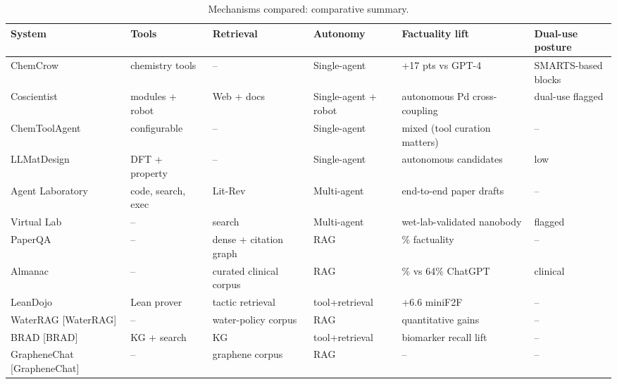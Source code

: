 \documentclass{article}
\begin{document}
\begin{table}[t]
\centering
\caption{Mechanisms compared: comparative summary.}
\label{tab:mechanisms-compared}
\begin{tabular}{>{\raggedright\arraybackslash}p{0.1985\linewidth}
  >{\raggedright\arraybackslash}p{0.1324\linewidth}
  >{\raggedright\arraybackslash}p{0.1691\linewidth}
  >{\raggedright\arraybackslash}p{0.1471\linewidth}
  >{\raggedright\arraybackslash}p{0.2132\linewidth}
  >{\raggedright\arraybackslash}p{0.1397\linewidth}}
\toprule
System & Tools & Retrieval & Autonomy & Factuality lift & Dual-use posture \\
\midrule
ChemCrow \cite{bran2024naturemachineintel} & 18 chemistry tools & -- & Single-agent & +17 pts vs GPT-4 & SMARTS-based blocks \\
Coscientist \cite{boiko2023nature6242023} & 4 modules + robot & Web + docs & Single-agent + robot & autonomous Pd cross-coupling & dual-use flagged \\
ChemToolAgent \cite{yu2024chemtoolagenttheim} & configurable & -- & Single-agent & mixed (tool curation matters) & -- \\
LLMatDesign \cite{jia2024arxiv2406131632024} & DFT + property & -- & Single-agent & autonomous candidates & low \\
Agent Laboratory \cite{schmidgall2025agentlaboratoryusi} & code, search, exec & Lit-Rev & Multi-agent & end-to-end paper drafts & -- \\
Virtual Lab \cite{swanson2024thevirtuallabaiage} & -- & search & Multi-agent & wet-lab-validated nanobody & flagged \\
PaperQA \cite{ala2023arxiv2312075592023} & -- & dense + citation graph & RAG & 73\% factuality & -- \\
Almanac \cite{zakka2024almanacretrievalau} & -- & curated clinical corpus & RAG & 91\% vs 64\% ChatGPT & clinical \\
LeanDojo \cite{yang2023leandojotheorempro} & Lean prover & tactic retrieval & tool+retrieval & +6.6 miniF2F & -- \\
WaterRAG {[}WaterRAG{]} & -- & water-policy corpus & RAG & quantitative gains & -- \\
BRAD {[}BRAD{]} & KG + search & KG & tool+retrieval & biomarker recall lift & -- \\
GrapheneChat {[}GrapheneChat{]} & -- & graphene corpus & RAG & -- & -- \\
\end{tabular}
\end{table}
\end{document}
